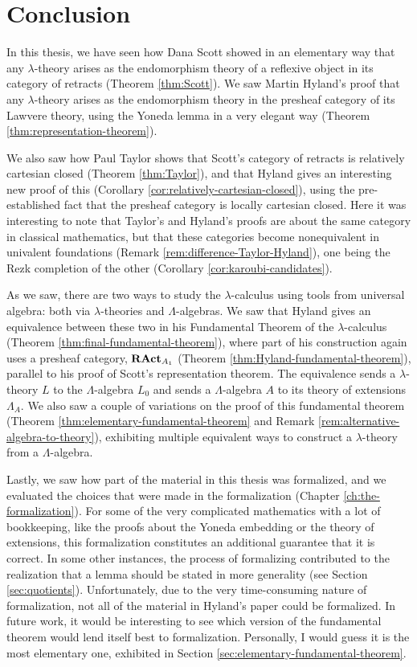 \chapter{Conclusion}
In this thesis, we have seen how Dana Scott showed in an elementary way that any $ \lambda $-theory arises as the endomorphism theory of a reflexive object in its category of retracts (Theorem \ref{thm:Scott}). We saw Martin Hyland's proof that any $ \lambda $-theory arises as the endomorphism theory in the presheaf category of its Lawvere theory, using the Yoneda lemma in a very elegant way (Theorem \ref{thm:representation-theorem}).

We also saw how Paul Taylor shows that Scott's category of retracts is relatively cartesian closed (Theorem \ref{thm:Taylor}), and that Hyland gives an interesting new proof of this (Corollary \ref{cor:relatively-cartesian-closed}), using the pre-established fact that the presheaf category is locally cartesian closed. Here it was interesting to note that Taylor's and Hyland's proofs are about the same category in classical mathematics, but that these categories become nonequivalent in univalent foundations (Remark \ref{rem:difference-Taylor-Hyland}), one being the Rezk completion of the other (Corollary \ref{cor:karoubi-candidates}).

As we saw, there are two ways to study the $ \lambda $-calculus using tools from universal algebra: both via $ \lambda $-theories and $ \Lambda $-algebras. We saw that Hyland gives an equivalence between these two in his Fundamental Theorem of the $ \lambda $-calculus (Theorem \ref{thm:final-fundamental-theorem}), where part of his construction again uses a presheaf category, $ \mathbf{RAct}_{A_1} $ (Theorem \ref{thm:Hyland-fundamental-theorem}), parallel to his proof of Scott's representation theorem. The equivalence sends a $ \lambda $-theory $ L $ to the $ \Lambda $-algebra $ L_0 $ and sends a $ \Lambda $-algebra $ A $ to its theory of extensions $ \Lambda_A $. We also saw a couple of variations on the proof of this fundamental theorem (Theorem \ref{thm:elementary-fundamental-theorem} and Remark \ref{rem:alternative-algebra-to-theory}), exhibiting multiple equivalent ways to construct a $ \lambda $-theory from a $ \Lambda $-algebra.

Lastly, we saw how part of the material in this thesis was formalized, and we evaluated the choices that were made in the formalization (Chapter \ref{ch:the-formalization}). For some of the very complicated mathematics with a lot of bookkeeping, like the proofs about the Yoneda embedding or the theory of extensions, this formalization constitutes an additional guarantee that it is correct. In some other instances, the process of formalizing contributed to the realization that a lemma should be stated in more generality (see Section \ref{sec:quotients}). Unfortunately, due to the very time-consuming nature of formalization, not all of the material in Hyland's paper could be formalized. In future work, it would be interesting to see which version of the fundamental theorem would lend itself best to formalization. Personally, I would guess it is the most elementary one, exhibited in Section \ref{sec:elementary-fundamental-theorem}.


